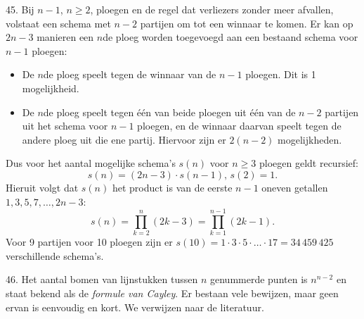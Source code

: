\clearpage

\begin{problem}{45.}
    Bij $n - 1$, $n \geq 2$, ploegen en de regel dat verliezers zonder meer afvallen, volstaat een schema met $n - 2$ partijen om tot een winnaar te komen. Er kan op $2n - 3$ manieren een $n$de ploeg worden toegevoegd aan een bestaand schema voor $n - 1$ ploegen:
    \begin{itemize}
        \item De $n$de ploeg speelt tegen de winnaar van de $n - 1$ ploegen. Dit is 1 mogelijkheid.
        \item De $n$de ploeg speelt tegen één van beide ploegen uit één van de $n - 2$ partijen uit het schema voor $n - 1$ ploegen, en de winnaar daarvan speelt tegen de andere ploeg uit die ene partij. Hiervoor zijn er $2 (n - 2)$ mogelijkheden.
    \end{itemize}
    Dus voor het aantal mogelijke schema's $s(n)$ voor $n \geq 3$ ploegen geldt recursief:
    \begin{equation*}
        s(n) = (2n - 3) \cdot s(n - 1),\, s(2) = 1.
    \end{equation*}
    Hieruit volgt dat $s(n)$ het product is van de eerste $n - 1$ oneven getallen $1,3,5,7,\dotsc,2n-3$:
    \begin{equation*}
        s(n) = \textstyle\prod\limits_{k = 2}^{n} (2k - 3) = \textstyle\prod\limits_{k = 1}^{n-1} (2k - 1).
    \end{equation*}
    Voor 9 partijen voor 10 ploegen zijn er $s(10) = 1 \cdot 3 \cdot 5 \cdot \dots \cdot 17 = 34\,459\,425$ verschillende schema's.
\end{problem}

\begin{problem}{46.}
	Het aantal bomen van lijnstukken tussen $n$ genummerde punten is $n^{n - 2}$ en staat bekend als de \textit{formule van Cayley}. Er bestaan vele bewijzen, maar geen ervan is eenvoudig en kort. We verwijzen naar de literatuur.
\end{problem}

\clearpage

